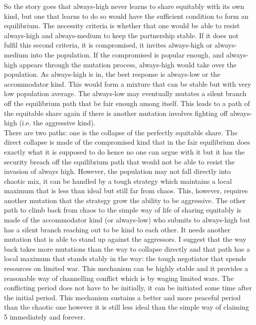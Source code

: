 \documentclass[12.5pt]{report}
\begin{document}
So the story goes that always-high never learns to share equitably with its own kind, but one that learns to do so would have the sufficient condition to form an equilibrium. The necessity criteria is whether that one would be able to resist always-high and always-medium to keep the partnership stable. If it does not fulfil this second criteria, it is compromised, it invites always-high or always-medium into the population. If the compromised is popular enough, and always-high appears through the mutation process, always-high would take over the population. As always-high is in, the best response is always-low or the accommodator kind. This would form a mixture that can be stable but with very low population average. The always-low may eventually mutates a silent branch off the equilibrium path that be fair enough among itself. This leads to a path of the equitable share again if there is another mutation involves fighting off always-high (i.e. the aggressive kind).\\

There are two paths: one is the collapse of the perfectly equitable share. The direct collapse is made of the compromised kind that in the fair equilibrium does exactly what it is supposed to do hence no one can argue with it but it has the security breach off the equilibrium path that would not be able to resist the invasion of always high. However, the population may not fall directly into chaotic mix, it can be handled by a tough strategy which maintains a local maximum that is less than ideal but still far from chaos. This, however, requires another mutation that the strategy grow the ability to be aggressive. The other path to climb back from chaos to the simple way of life of sharing equitably is made of the accommodator kind (or always-low) who submits to always-high but has a silent branch reaching out to be kind to each other. It needs another mutation that is able to stand up against the aggressors. I suggest that the way back takes more mutations than the way to collapse directly and that path has a local maximum that stands stably in the way: the tough negotiator that spends resources on limited war. This mechanism can be highly stable and it provides a reasonable way of channelling conflict which is by waging limited wars. The conflicting period does not have to be initially, it can be initiated some time after the initial period. This mechanism sustains a better and more peaceful period than the chaotic one however it is still less ideal than the simple way of claiming 5 immediately and forever.\\
\end{document}
